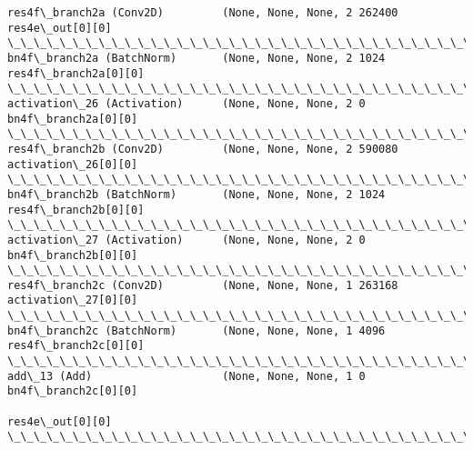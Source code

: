 \documentclass[11pt]{article}
\begin{document}
\begin{Verbatim}[commandchars=\\\{\}]
res4f\_branch2a (Conv2D)         (None, None, None, 2 262400      res4e\_out[0][0]                  
\_\_\_\_\_\_\_\_\_\_\_\_\_\_\_\_\_\_\_\_\_\_\_\_\_\_\_\_\_\_\_\_\_\_\_\_\_\_\_\_\_\_\_\_\_\_\_\_\_\_\_\_\_\_\_\_\_\_\_\_\_\_\_\_\_\_\_\_\_\_\_\_\_\_\_\_\_\_\_\_\_\_\_\_\_\_\_\_\_\_\_\_\_\_\_\_\_\_
bn4f\_branch2a (BatchNorm)       (None, None, None, 2 1024        res4f\_branch2a[0][0]             
\_\_\_\_\_\_\_\_\_\_\_\_\_\_\_\_\_\_\_\_\_\_\_\_\_\_\_\_\_\_\_\_\_\_\_\_\_\_\_\_\_\_\_\_\_\_\_\_\_\_\_\_\_\_\_\_\_\_\_\_\_\_\_\_\_\_\_\_\_\_\_\_\_\_\_\_\_\_\_\_\_\_\_\_\_\_\_\_\_\_\_\_\_\_\_\_\_\_
activation\_26 (Activation)      (None, None, None, 2 0           bn4f\_branch2a[0][0]              
\_\_\_\_\_\_\_\_\_\_\_\_\_\_\_\_\_\_\_\_\_\_\_\_\_\_\_\_\_\_\_\_\_\_\_\_\_\_\_\_\_\_\_\_\_\_\_\_\_\_\_\_\_\_\_\_\_\_\_\_\_\_\_\_\_\_\_\_\_\_\_\_\_\_\_\_\_\_\_\_\_\_\_\_\_\_\_\_\_\_\_\_\_\_\_\_\_\_
res4f\_branch2b (Conv2D)         (None, None, None, 2 590080      activation\_26[0][0]              
\_\_\_\_\_\_\_\_\_\_\_\_\_\_\_\_\_\_\_\_\_\_\_\_\_\_\_\_\_\_\_\_\_\_\_\_\_\_\_\_\_\_\_\_\_\_\_\_\_\_\_\_\_\_\_\_\_\_\_\_\_\_\_\_\_\_\_\_\_\_\_\_\_\_\_\_\_\_\_\_\_\_\_\_\_\_\_\_\_\_\_\_\_\_\_\_\_\_
bn4f\_branch2b (BatchNorm)       (None, None, None, 2 1024        res4f\_branch2b[0][0]             
\_\_\_\_\_\_\_\_\_\_\_\_\_\_\_\_\_\_\_\_\_\_\_\_\_\_\_\_\_\_\_\_\_\_\_\_\_\_\_\_\_\_\_\_\_\_\_\_\_\_\_\_\_\_\_\_\_\_\_\_\_\_\_\_\_\_\_\_\_\_\_\_\_\_\_\_\_\_\_\_\_\_\_\_\_\_\_\_\_\_\_\_\_\_\_\_\_\_
activation\_27 (Activation)      (None, None, None, 2 0           bn4f\_branch2b[0][0]              
\_\_\_\_\_\_\_\_\_\_\_\_\_\_\_\_\_\_\_\_\_\_\_\_\_\_\_\_\_\_\_\_\_\_\_\_\_\_\_\_\_\_\_\_\_\_\_\_\_\_\_\_\_\_\_\_\_\_\_\_\_\_\_\_\_\_\_\_\_\_\_\_\_\_\_\_\_\_\_\_\_\_\_\_\_\_\_\_\_\_\_\_\_\_\_\_\_\_
res4f\_branch2c (Conv2D)         (None, None, None, 1 263168      activation\_27[0][0]              
\_\_\_\_\_\_\_\_\_\_\_\_\_\_\_\_\_\_\_\_\_\_\_\_\_\_\_\_\_\_\_\_\_\_\_\_\_\_\_\_\_\_\_\_\_\_\_\_\_\_\_\_\_\_\_\_\_\_\_\_\_\_\_\_\_\_\_\_\_\_\_\_\_\_\_\_\_\_\_\_\_\_\_\_\_\_\_\_\_\_\_\_\_\_\_\_\_\_
bn4f\_branch2c (BatchNorm)       (None, None, None, 1 4096        res4f\_branch2c[0][0]             
\_\_\_\_\_\_\_\_\_\_\_\_\_\_\_\_\_\_\_\_\_\_\_\_\_\_\_\_\_\_\_\_\_\_\_\_\_\_\_\_\_\_\_\_\_\_\_\_\_\_\_\_\_\_\_\_\_\_\_\_\_\_\_\_\_\_\_\_\_\_\_\_\_\_\_\_\_\_\_\_\_\_\_\_\_\_\_\_\_\_\_\_\_\_\_\_\_\_
add\_13 (Add)                    (None, None, None, 1 0           bn4f\_branch2c[0][0]              
                                                                 res4e\_out[0][0]                  
\_\_\_\_\_\_\_\_\_\_\_\_\_\_\_\_\_\_\_\_\_\_\_\_\_\_\_\_\_\_\_\_\_\_\_\_\_\_\_\_\_\_\_\_\_\_\_\_\_\_\_\_\_\_\_\_\_\_\_\_\_\_\_\_\_\_\_\_\_\_\_\_\_\_\_\_\_\_\_\_\_\_\_\_\_\_\_\_\_\_\_\_\_\_\_\_\_\_

\end{Verbatim}
\end{document}
